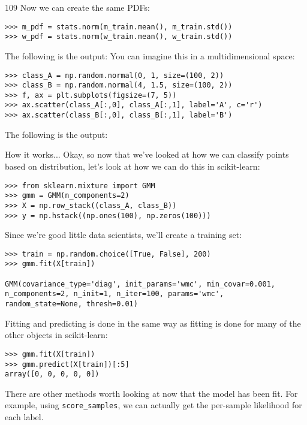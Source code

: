 \documentclass[SKL-MASTER.tex]{subfiles}
\begin{document}
109
Now we can create the same PDFs:
\begin{framed}
\begin{verbatim}
>>> m_pdf = stats.norm(m_train.mean(), m_train.std())
>>> w_pdf = stats.norm(w_train.mean(), w_train.std())
\end{verbatim}
\end{framed}
The following is the output:
You can imagine this in a multidimensional space:
\begin{framed}
	\begin{verbatim}
>>> class_A = np.random.normal(0, 1, size=(100, 2))
>>> class_B = np.random.normal(4, 1.5, size=(100, 2))
>>> f, ax = plt.subplots(figsize=(7, 5))
>>> ax.scatter(class_A[:,0], class_A[:,1], label='A', c='r')
>>> ax.scatter(class_B[:,0], class_B[:,1], label='B')
\end{verbatim}
\end{framed}
The following is the output:


How it works...
Okay, so now that we've looked at how we can classify points based on distribution, let's look
at how we can do this in scikit-learn:
\begin{framed}
	\begin{verbatim}
>>> from sklearn.mixture import GMM
>>> gmm = GMM(n_components=2)
>>> X = np.row_stack((class_A, class_B))
>>> y = np.hstack((np.ones(100), np.zeros(100)))
\end{verbatim}
\end{framed}
Since we're good little data scientists, we'll create a training set:
\begin{framed}
	\begin{verbatim}
>>> train = np.random.choice([True, False], 200)
>>> gmm.fit(X[train])

GMM(covariance_type='diag', init_params='wmc', min_covar=0.001,
n_components=2, n_init=1, n_iter=100, params='wmc',
random_state=None, thresh=0.01)
\end{verbatim}
\end{framed}
Fitting and predicting is done in the same way as fitting is done for many of the other objects
in scikit-learn:
\begin{framed}
	\begin{verbatim}
>>> gmm.fit(X[train])
>>> gmm.predict(X[train])[:5]
array([0, 0, 0, 0, 0])
\end{verbatim}
\end{framed}
There are other methods worth looking at now that the model has been fit.
For example, using \texttt{score\_samples}, we can actually get the per-sample likelihood for
each label.
\end{document}
